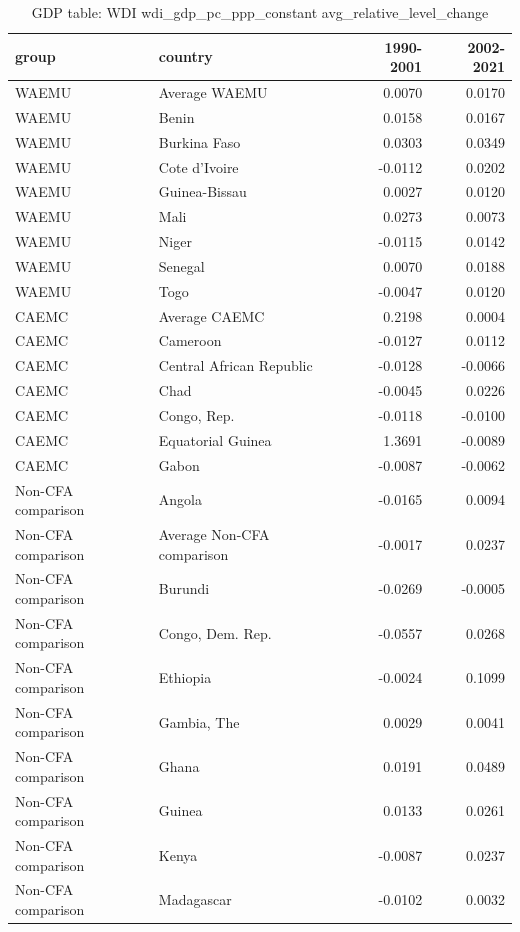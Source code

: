 \begin{table}

\caption{GDP table: WDI wdi_gdp_pc_ppp_constant avg_relative_level_change}
\centering
\begin{tabular}[t]{llrr}
\toprule
group & country & 1990-2001 & 2002-2021\\
\midrule
WAEMU & Average WAEMU & 0.0070 & 0.0170\\
WAEMU & Benin & 0.0158 & 0.0167\\
WAEMU & Burkina Faso & 0.0303 & 0.0349\\
WAEMU & Cote d'Ivoire & -0.0112 & 0.0202\\
WAEMU & Guinea-Bissau & 0.0027 & 0.0120\\
\addlinespace
WAEMU & Mali & 0.0273 & 0.0073\\
WAEMU & Niger & -0.0115 & 0.0142\\
WAEMU & Senegal & 0.0070 & 0.0188\\
WAEMU & Togo & -0.0047 & 0.0120\\
CAEMC & Average CAEMC & 0.2198 & 0.0004\\
\addlinespace
CAEMC & Cameroon & -0.0127 & 0.0112\\
CAEMC & Central African Republic & -0.0128 & -0.0066\\
CAEMC & Chad & -0.0045 & 0.0226\\
CAEMC & Congo, Rep. & -0.0118 & -0.0100\\
CAEMC & Equatorial Guinea & 1.3691 & -0.0089\\
\addlinespace
CAEMC & Gabon & -0.0087 & -0.0062\\
Non-CFA comparison & Angola & -0.0165 & 0.0094\\
Non-CFA comparison & Average Non-CFA comparison & -0.0017 & 0.0237\\
Non-CFA comparison & Burundi & -0.0269 & -0.0005\\
Non-CFA comparison & Congo, Dem. Rep. & -0.0557 & 0.0268\\
\addlinespace
Non-CFA comparison & Ethiopia & -0.0024 & 0.1099\\
Non-CFA comparison & Gambia, The & 0.0029 & 0.0041\\
Non-CFA comparison & Ghana & 0.0191 & 0.0489\\
Non-CFA comparison & Guinea & 0.0133 & 0.0261\\
Non-CFA comparison & Kenya & -0.0087 & 0.0237\\
\addlinespace
Non-CFA comparison & Madagascar & -0.0102 & 0.0032\\

\end{tabular}
\end{table}
